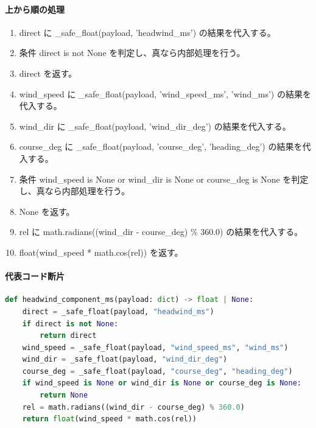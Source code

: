 \documentclass[a4paper,11pt]{article}
\begin{document}
            \paragraph{上から順の処理}
            \begin{enumerate}[leftmargin=1.8em]
            \item direct に \_safe\_float(payload, 'headwind\_ms') の結果を代入する。
\item 条件 direct is not None を判定し、真なら内部処理を行う。
\item   direct を返す。
\item wind\_speed に \_safe\_float(payload, 'wind\_speed\_ms', 'wind\_ms') の結果を代入する。
\item wind\_dir に \_safe\_float(payload, 'wind\_dir\_deg') の結果を代入する。
\item course\_deg に \_safe\_float(payload, 'course\_deg', 'heading\_deg') の結果を代入する。
\item 条件 wind\_speed is None or wind\_dir is None or course\_deg is None を判定し、真なら内部処理を行う。
\item   None を返す。
\item rel に math.radians((wind\_dir - course\_deg) \% 360.0) の結果を代入する。
\item float(wind\_speed * math.cos(rel)) を返す。
            \end{enumerate}
            \paragraph{代表コード断片}
            \begin{lstlisting}[language=Python]
def headwind_component_ms(payload: dict) -> float | None:
    direct = _safe_float(payload, "headwind_ms")
    if direct is not None:
        return direct
    wind_speed = _safe_float(payload, "wind_speed_ms", "wind_ms")
    wind_dir = _safe_float(payload, "wind_dir_deg")
    course_deg = _safe_float(payload, "course_deg", "heading_deg")
    if wind_speed is None or wind_dir is None or course_deg is None:
        return None
    rel = math.radians((wind_dir - course_deg) % 360.0)
    return float(wind_speed * math.cos(rel))
\end{lstlisting}
\end{document}
